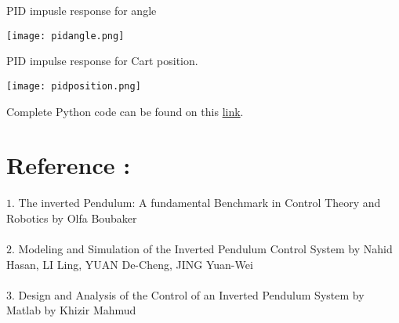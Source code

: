 \documentclass[11pt]{article}
\begin{document}
{PID impusle response for angle}
\begin{center}
\texttt{[image: pidangle.png]}    
\end{center}
{PID impulse response for Cart position.}
\begin{center}
\texttt{[image: pidposition.png]} 
\end{center}

{
Complete Python code can be found on this  
\href{https://colab.research.google.com/drive/1Rln0c7YORMVwMl-ny6Y4jFIXjyOoNrah?usp=sharing}{link}.
}
\newpage
\section{Reference :}
{$1.$ The inverted Pendulum: A fundamental Benchmark in Control Theory and Robotics by Olfa Boubaker\\\\
$2.$ Modeling and Simulation of the Inverted Pendulum Control System by Nahid Hasan, LI Ling, YUAN De-Cheng, JING Yuan-Wei\\\\
$3.$ Design and Analysis of the Control of an Inverted Pendulum System by Matlab by Khizir Mahmud \\\\
}
\end{document}
